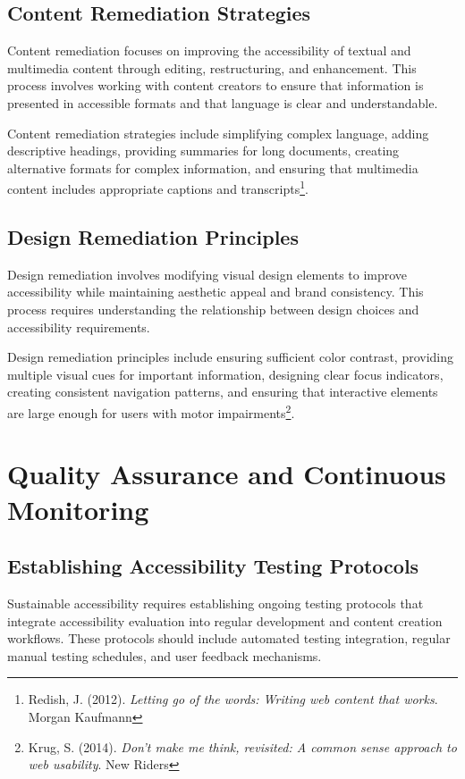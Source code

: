 \subsection{Content Remediation Strategies}

Content remediation focuses on improving the accessibility of textual and multimedia content through editing, restructuring, and enhancement. This process involves working with content creators to ensure that information is presented in accessible formats and that language is clear and understandable.

Content remediation strategies include simplifying complex language, adding descriptive headings, providing summaries for long documents, creating alternative formats for complex information, and ensuring that multimedia content includes appropriate captions and transcripts\footnote{Redish, J. (2012). \textit{Letting go of the words: Writing web content that works}. Morgan Kaufmann}.

\subsection{Design Remediation Principles}

Design remediation involves modifying visual design elements to improve accessibility while maintaining aesthetic appeal and brand consistency. This process requires understanding the relationship between design choices and accessibility requirements.

Design remediation principles include ensuring sufficient color contrast, providing multiple visual cues for important information, designing clear focus indicators, creating consistent navigation patterns, and ensuring that interactive elements are large enough for users with motor impairments\footnote{Krug, S. (2014). \textit{Don't make me think, revisited: A common sense approach to web usability}. New Riders}.

\section{Quality Assurance and Continuous Monitoring}\label{sec:qa-monitoring}

\subsection{Establishing Accessibility Testing Protocols}

Sustainable accessibility requires establishing ongoing testing protocols that integrate accessibility evaluation into regular development and content creation workflows. These protocols should include automated testing integration, regular manual testing schedules, and user feedback mechanisms.

